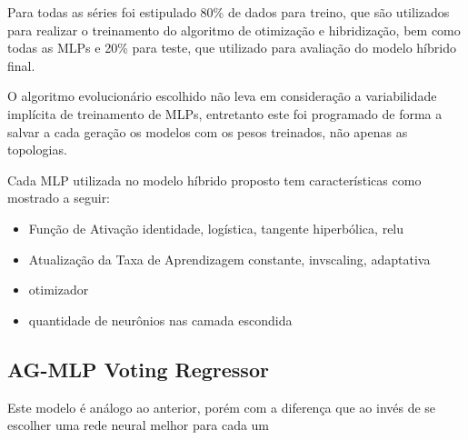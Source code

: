 Para todas as séries foi estipulado 80\% de dados para treino, que são utilizados para realizar o treinamento do algoritmo de otimização e hibridização, bem como todas as MLPs e 20\% para teste, que utilizado para avaliação do modelo híbrido final.

O algoritmo evolucionário escolhido não leva em consideração a variabilidade implícita de treinamento de MLPs, entretanto este foi programado de forma a salvar a cada geração os modelos com os pesos treinados, não apenas as topologias.

Cada MLP utilizada no modelo híbrido proposto tem características como mostrado a seguir:
\begin{itemize}
    \item Função de Ativação {identidade, logística, tangente hiperbólica,
relu}
    \item Atualização da Taxa de Aprendizagem {constante, invscaling,
adaptativa}
    \item otimizador
    \item quantidade de neurônios nas camada escondida
\end{itemize}

\subsection{AG-MLP Voting Regressor}
\label{subsec:ag-mlp-vr}

Este modelo é análogo ao anterior, porém com a diferença que ao invés de se escolher uma rede neural melhor para cada um 

